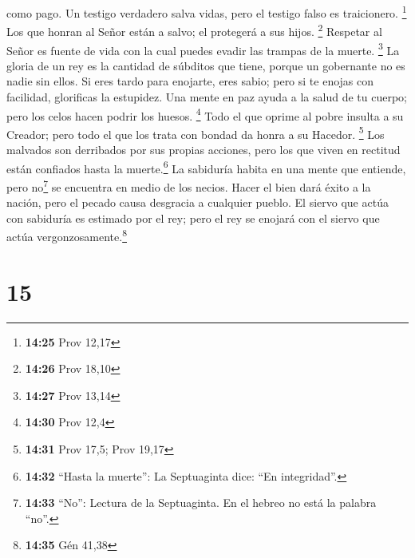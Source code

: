 como pago.  Un testigo verdadero salva vidas, pero el
testigo falso es traicionero. \footnote{\textbf{14:25} Prov 12,17}
 Los que honran al Señor están a salvo; el protegerá a
sus hijos. \footnote{\textbf{14:26} Prov 18,10}  Respetar
al Señor es fuente de vida con la cual puedes evadir las trampas de la
muerte. \footnote{\textbf{14:27} Prov 13,14}  La gloria
de un rey es la cantidad de súbditos que tiene, porque un gobernante no
es nadie sin ellos.  Si eres tardo para enojarte, eres
sabio; pero si te enojas con facilidad, glorificas la estupidez.
 Una mente en paz ayuda a la salud de tu cuerpo; pero los
celos hacen podrir los huesos. \footnote{\textbf{14:30} Prov 12,4}
 Todo el que oprime al pobre insulta a su Creador; pero
todo el que los trata con bondad da honra a su Hacedor. \footnote{\textbf{14:31}
  Prov 17,5; Prov 19,17}  Los malvados son derribados por
sus propias acciones, pero los que viven en rectitud están confiados
hasta la muerte.\footnote{\textbf{14:32} ``Hasta la muerte'': La
  Septuaginta dice: ``En integridad''.}  La sabiduría
habita en una mente que entiende, pero no\footnote{\textbf{14:33}
  ``No'': Lectura de la Septuaginta. En el hebreo no está la palabra
  ``no''.} se encuentra en medio de los necios.  Hacer el
bien dará éxito a la nación, pero el pecado causa desgracia a cualquier
pueblo.  El siervo que actúa con sabiduría es estimado
por el rey; pero el rey se enojará con el siervo que actúa
vergonzosamente.\footnote{\textbf{14:35} Gén 41,38}

\hypertarget{section-14}{%
\section{15}\label{section-14}}

